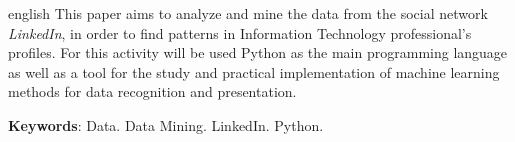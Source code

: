\begin{resumo}[ABSTRACT]
 \begin{otherlanguage*}{english}
This paper aims to analyze and mine the data from the social network \textit{LinkedIn}, in order to find patterns in Information Technology professional's profiles. For this activity will be used Python as the main programming language as well as a tool for the study and practical implementation of machine learning methods for data recognition and presentation.
   
   \vspace{\onelineskip}
 
   \noindent 
   \textbf{Keywords}: Data. Data Mining. LinkedIn. Python.
 \end{otherlanguage*}
\end{resumo}
